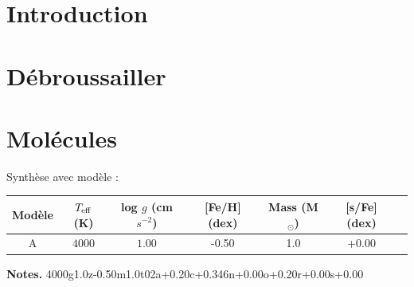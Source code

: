 \documentclass{article}
\begin{document}
	

\vspace{0.9cm}

\tableofcontents

\clearpage

\section{Introduction}

\section{Débroussailler}


\section{Molécules}

Synthèse avec modèle : 

\begin{table}[h!]
  \begin{center}
  \begin{tabular}{ccccccc}
      \hline
      \hline
      Modèle & $T_{\rm eff}$ (K) & log $g$ (cm $s^{-2}$) & [Fe/H] (dex) & Mass (M$_\odot$) & [s/Fe] (dex)\\
      \hline
      A &  $4000$ & $1.00$ & -0.50 & 1.0& +0.00 \\
      \hline
  \end{tabular}
  \end{center}
  \textbf{Notes.} 4000g1.0z-0.50m1.0t02a+0.20c+0.346n+0.00o+0.20r+0.00s+0.00
  \label{MARCS}
  \end{table}
\end{document}
